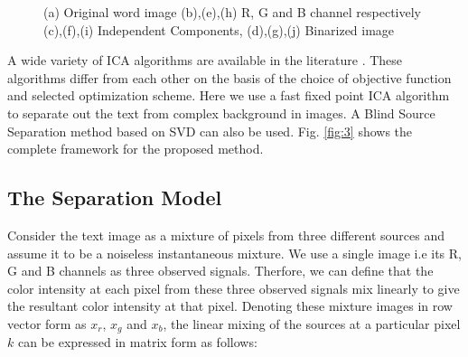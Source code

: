 \begin{figure}[t]
\hspace*{1.5in}
\caption
{(a) Original word image (b),(e),(h) R, G and B channel respectively
(c),(f),(i) Independent Components, (d),(g),(j) Binarized image}
\label{fig:4}
\end{figure}

A wide variety of ICA algorithms are available in the literature \cite{A11,A12}. These algorithms differ from each other on the
basis of the choice of objective function and selected optimization scheme. Here we use a fast fixed point
ICA algorithm to separate out the text from complex background in images. A Blind Source 
Separation method based on SVD \cite{A10} can also be used. Fig. \ref{fig:3} 
shows the complete framework for the proposed method.

\subsection{The Separation Model}

Consider the text image as a mixture of pixels from three different sources
and assume it to be a noiseless instantaneous mixture.
We use a single image i.e its R, G and B channels as three observed signals.
Therfore, we can define that the color intensity at each pixel from these three observed signals
mix linearly to give the resultant color intensity at that pixel.
Denoting these mixture images in row vector form
as $x_r$, $x_g$ and $x_b$, the linear mixing of the sources at a particular pixel $k$ can be
expressed in matrix form as follows:

